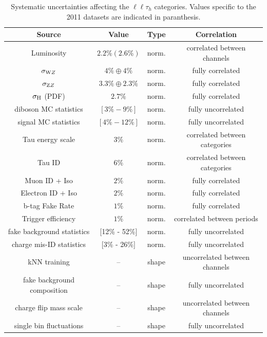 \begin{table}
  \begin{center}
    \caption{Systematic uncertainties affecting the $\ell\ell\tau_h$ categories. Values specific to the 2011 datasets are indicated in paranthesis.}
    \label{tab:systematics}
    \begin{tabular}{c c c c}
      \hline
      Source                  & Value & Type & Correlation\\
      \hline
      Luminosity              & $2.2\% (2.6\%)$ & norm. & correlated between channels \\
      $\sigma_{\rm WZ}$        & $4\% \oplus 4\%$  & norm. & fully correlated\\
      $\sigma_{\rm ZZ}$        & $3.3\% \oplus 2.3\%$   & norm. & fully correlated\\
      $\sigma_{\rm H}$ (PDF)   & $2.7\%$  & norm. & fully correlated \\
      diboson MC statistics & $[3\% - 9\%]$ & norm. & fully uncorrelated \\
      signal MC statistics & $[4\% - 12\%]$ & norm. & fully uncorrelated \\
      Tau energy scale        & $3\%$   & norm. & correlated between categories\\
      Tau ID                  & $6\%$ & norm. & correlated between categories\\
      Muon ID + Iso           & $2\%$ & norm. & fully correlated \\
      Electron ID + Iso       & $2\%$ & norm. & fully correlated  \\
      b-tag Fake Rate         & $1\%$ & norm. & fully correlated  \\
      Trigger efficiency  & $1\%$ & norm. & correlated between periods  \\
      fake background statistics & [12\% - 52\%] & norm. & fully uncorrelated \\
      charge mis-ID statistics & [3\% - 26\%] & norm. & fully uncorrelated \\
      kNN training & -- & shape & uncorrelated between channels \\
      fake background composition & -- & shape & fully uncorrelated \\
      charge flip mass scale & -- & shape & uncorrelated between channels \\
      single bin fluctuations & -- & shape & fully uncorrelated \\
      \hline
    \end{tabular}
  \end{center}
\end{table}

